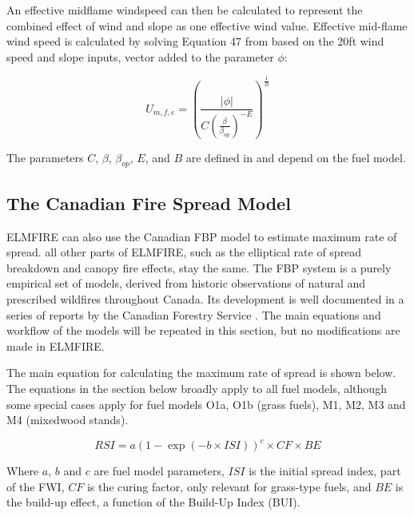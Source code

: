 An effective midflame windspeed can then be calculated to represent the combined effect of wind and slope as one effective wind value. Effective mid-flame wind speed is calculated by solving Equation 47 from \cite{rothermelMathematicalModelPredicting1972} based on the 20ft wind speed and slope inputs, vector added to the parameter $\phi$:

\begin{equation}
U_{m,f,e} = 
\left(
\frac{\,|\phi|\,}{C \left( \frac{\beta}{\beta_{op}} \right)^{-E}}
\right)^{\frac{1}{B}}
\end{equation}

The parameters $C$, $\beta$, $\beta_{op}$, $E$, and $B$ are defined in \cite{rothermelMathematicalModelPredicting1972} and depend on the fuel model.

\subsection{The Canadian Fire Spread Model}

ELMFIRE can also use the Canadian FBP model to estimate maximum rate of spread. all other parts of ELMFIRE, such as the elliptical rate of spread breakdown and canopy fire effects, stay the same. The FBP system is a purely empirical set of models, derived from historic observations of natural and prescribed wildfires throughout Canada. Its development is well documented in a series of reports by the Canadian Forestry Service \cite{vanwagnerDevelopmentStructureCanadian1987, DevelopmentStructureCanadian1992, wottonUpdatesRevisions19922009, tymstraDevelopmentStructurePrometheus2010}. The main equations and workflow of the models will be repeated in this section, but no modifications are made in ELMFIRE.

The main equation for calculating the maximum rate of spread is shown below. The equations in the section below broadly apply to all fuel models, although some special cases apply for fuel models O1a, O1b (grass fuels), M1, M2, M3 and M4 (mixedwood stands).

\begin{equation}
    RSI = a(1-\exp(-b \times ISI))^{c}\times CF\times BE
\end{equation}

Where $a$, $b$ and $c$ are fuel model parameters, $ISI$ is the initial spread index, part of the FWI, $CF$ is the curing factor, only relevant for grass-type fuels, and $BE$ is the build-up effect, a function of the Build-Up Index (BUI). 

